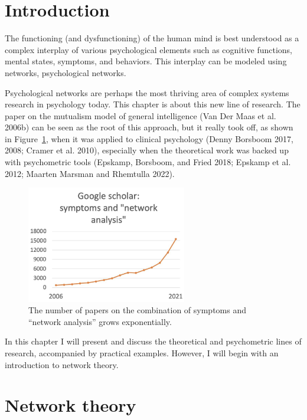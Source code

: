 \documentclass[
  letterpaper,
]{scrbook}
\begin{document}
\hypertarget{introduction-3}{%
\section{Introduction}\label{introduction-3}}

The functioning (and dysfunctioning) of the human mind is best
understood as a complex interplay of various psychological elements such
as cognitive functions, mental states, symptoms, and behaviors. This
interplay can be modeled using networks, psychological networks.

Psychological networks are perhaps the most thriving area of complex
systems research in psychology today. This chapter is about this new
line of research. The paper on the mutualism model of general
intelligence (Van Der Maas et al. 2006b) can be seen as the root of this
approach, but it really took off, as shown in
Figure~\ref{fig-ch6-img1-old-70}, when it was applied to clinical
psychology (Denny Borsboom 2017, 2008; Cramer et al. 2010), especially
when the theoretical work was backed up with psychometric tools
(Epskamp, Borsboom, and Fried 2018; Epskamp et al. 2012; Maarten Marsman
and Rhemtulla 2022).

\begin{figure}

{\centering \includegraphics[width=2.7509in,height=\textheight]{media/ch6/image1.jpg}

}

\caption{\label{fig-ch6-img1-old-70}The number of papers on the
combination of symptoms and ``network analysis'' grows exponentially.}

\end{figure}

In this chapter I will present and discuss the theoretical and
psychometric lines of research, accompanied by practical examples.
However, I will begin with an introduction to network theory.

\hypertarget{network-theory}{%
\section{Network theory}\label{network-theory}}
\end{document}
